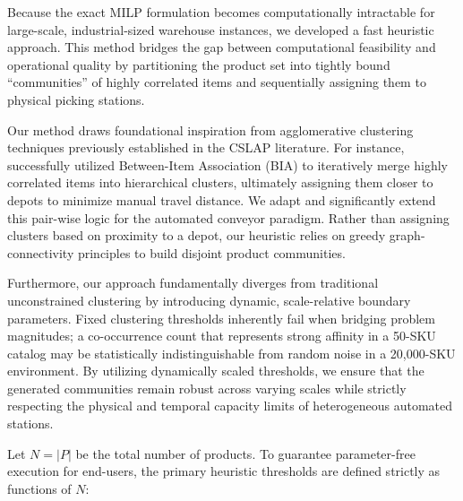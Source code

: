 \documentclass[preprint,review,11pt,authoryear]{elsarticle}
\begin{document}
Because the exact MILP formulation becomes computationally intractable for large-scale, industrial-sized warehouse instances, we developed a fast heuristic approach. This method bridges the gap between computational feasibility and operational quality by partitioning the product set into tightly bound ``communities'' of highly correlated items and sequentially assigning them to physical picking stations.

Our method draws foundational inspiration from agglomerative clustering techniques previously established in the CSLAP literature. For instance, \cite{chuang2016} successfully utilized Between-Item Association (BIA) to iteratively merge highly correlated items into hierarchical clusters, ultimately assigning them closer to depots to minimize manual travel distance. We adapt and significantly extend this pair-wise logic for the automated conveyor paradigm. Rather than assigning clusters based on proximity to a depot, our heuristic relies on greedy graph-connectivity principles \cite{west2001introduction} to build disjoint product communities.

Furthermore, our approach fundamentally diverges from traditional unconstrained clustering by introducing dynamic, scale-relative boundary parameters. Fixed clustering thresholds inherently fail when bridging problem magnitudes; a co-occurrence count that represents strong affinity in a 50-SKU catalog may be statistically indistinguishable from random noise in a 20,000-SKU environment. By utilizing dynamically scaled thresholds, we ensure that the generated communities remain robust across varying scales while strictly respecting the physical and temporal capacity limits of heterogeneous automated stations.

Let $N = |P|$ be the total number of products. To guarantee parameter-free execution for end-users, the primary heuristic thresholds are defined strictly as functions of $N$:
\end{document}
